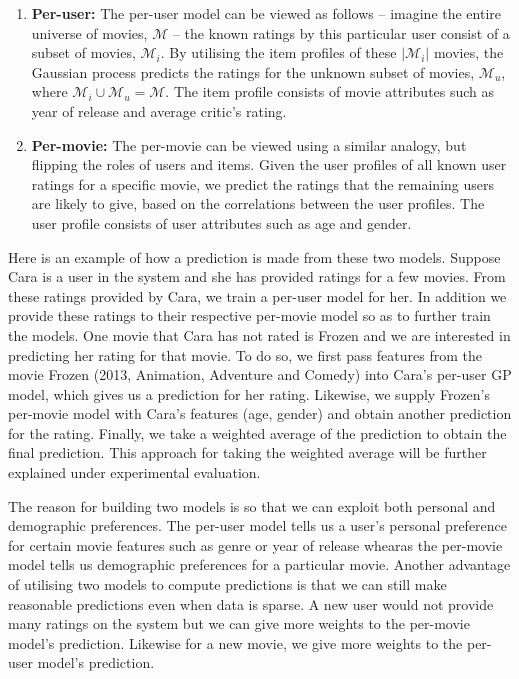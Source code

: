\documentclass[letterpaper]{article}
\begin{document}
\begin{enumerate}
	\item \textbf{Per-user:} The per-user model can be viewed as follows -- imagine the entire universe of movies, $\mathcal{M}$ -- the known ratings by this particular user consist of a subset of movies, $\mathcal{M}_i$. By utilising the item profiles of these $\vert \mathcal{M}_i \vert$ movies, the Gaussian process predicts the ratings for the unknown subset of movies, $\mathcal{M}_u$, where $\mathcal{M}_i \cup \mathcal{M}_u = \mathcal{M}$. The item profile consists of movie attributes such as year of release and average critic's rating.
	\item \textbf{Per-movie:} The per-movie can be viewed using a similar analogy, but flipping the roles of users and items. Given the user profiles of all known user ratings for a specific movie, we predict the ratings that the remaining users are likely to give, based on the correlations between the user profiles. The user profile consists of user attributes such as age and gender.
\end{enumerate}

Here is an example of how a prediction is made from these two models.
Suppose Cara is a user in the system and she has provided ratings for a few movies. 
From these ratings provided by Cara, we train a per-user model for her.
In addition we provide these ratings to their respective per-movie model so as to further train the models.
One movie that Cara has not rated is Frozen and we are interested in predicting her rating for that movie.
To do so, we first pass features from the movie Frozen (2013, Animation, Adventure and Comedy) into Cara's per-user GP model, which gives us a prediction for her rating.
Likewise, we supply Frozen's per-movie model with Cara's features (age, gender) and obtain another prediction for the rating.
Finally, we take a weighted average of the prediction to obtain the final prediction. 
This approach for taking the weighted average will be further explained under experimental evaluation.

The reason for building two models is so that we can exploit both personal and demographic preferences. The per-user model tells us a user's personal preference for certain movie features such as genre or year of release whearas the per-movie model tells us demographic preferences for a particular movie. Another advantage of utilising two models to compute predictions is that we can still make reasonable predictions even when data is sparse. A new user would not provide many ratings on the system but we can give more weights to the per-movie model's prediction. Likewise for a new movie, we give more weights to the per-user model's prediction.
\end{document}
